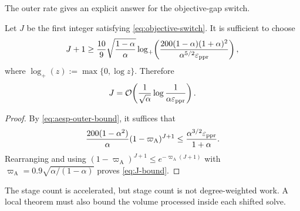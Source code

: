 The outer rate gives an explicit answer for the objective-gap switch.

\begin{proposition}
\label{prop:J-bound}
Let $J$ be the first integer satisfying \cref{eq:objective-switch}.  It is
sufficient to choose
\begin{equation}
  J+1
  \geq
  \frac{10}{9}\sqrt{\frac{1-\alpha}{\alpha}}
  \log_+\!\left(
    \frac{200(1-\alpha)(1+\alpha)^2}
         {\alpha^{5/2}\varepsilon_{\mathrm{ppr}}}
  \right),
  \label{eq:J-bound}
\end{equation}
where $\log_+(z):=\max\{0,\log z\}$.  Therefore
\begin{equation}
  J
  =\mathcal{O}\!\left(
    \frac1{\sqrt\alpha}\log\frac1{\alpha\varepsilon_{\mathrm{ppr}}}
  \right).
  \label{eq:J-order}
\end{equation}
\end{proposition}

\begin{proof}
By \cref{eq:aesp-outer-bound}, it suffices that
\[
  \frac{200(1-\alpha^2)}{\alpha}
  (1-\varpi_{\mathrm A})^{J+1}
  \leq\frac{\alpha^{3/2}\varepsilon_{\mathrm{ppr}}}{1+\alpha}.
\]
Rearranging and using
$(1-\varpi_{\mathrm A})^{J+1}\leq e^{-\varpi_{\mathrm A}(J+1)}$ with
$\varpi_{\mathrm A}=0.9\sqrt{\alpha/(1-\alpha)}$ proves
\cref{eq:J-bound}.
\end{proof}

The stage count is accelerated, but stage count is not degree-weighted work.
A local theorem must also bound the volume processed inside each shifted
solve.
